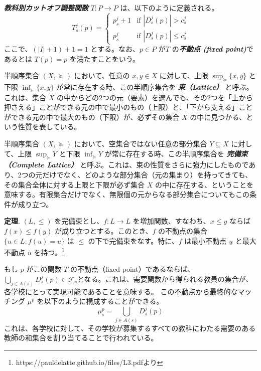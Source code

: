 \documentclass[12pt, a4paper]{article}
\theoremstyle{definition}
\theoremstyle{remark}
\theoremstyle{plain}
\begin{document}
\textbf{\textit{教科別カットオフ調整関数}} $T : P \rightarrow P$ は、以下のように定義される。
\[
T_s^j(p) =
\begin{cases}
p_s^j + 1 & \text{if } | D_s^j(p) | > c^j_s \\
p_s^j     & \text{if } | D_s^j(p) | \leq c^j_s
\end{cases}
\]
ここで、\( (|I| + 1) + 1 = 1 \) とする。なお、$p\in P$ が$T$ の\textbf{\textit{不動点 (fixed point)}}であるとは $T(p)=p$ を満たすことをいう。



半順序集合 $(X, \succeq)$ において、任意の $x, y \in X$ に対して、上限 $\sup_{\succeq} \{x, y\}$ と下限 $\inf_{\succeq} \{x, y\}$ が常に存在する時、この半順序集合を \textbf{\textit{束（Lattice）}} と呼ぶ。これは、集合 $X$ の中からどの2つの元（要素）を選んでも、その2つを「上から押さえる」ことができる元の中で最小のもの（上限）と、「下から支える」ことができる元の中で最大のもの（下限）が、必ずその集合 $X$ の中に見つかる、という性質を表している。


半順序集合 $(X, \succeq)$ において、空集合ではない任意の部分集合 $Y \subseteq X$ に対して、上限 $\sup_{\succeq} Y$ と下限 $\inf_{\succeq} Y$ が常に存在する時、この半順序集合を \textbf{\textit{完備束（Complete Lattice）}} と呼ぶ。これは、束の性質をさらに強力にしたものであり、2つの元だけでなく、どのような部分集合（元の集まり）を持ってきても、その集合全体に対する上限と下限が必ず集合 $X$ の中に存在する、ということを意味する。有限集合だけでなく、無限個の元からなる部分集合についてもこの条件が成り立つ。


\textbf{定理}. $(L, \leq)$ を完備束とし、$f: L \to L$ を増加関数、すなわち、$x \leq y$ ならば $f(x) \leq f(y)$ が成り立つとする。このとき、$f$ の不動点の集合 $\{ u \in L : f(u) = u \}$ は $\leq$ の下で完備束をなす。特に、$f$ は最小不動点 $\underline{u}$ と最大不動点 $\overline{u}$ を持つ。\footnote{https://pauldelatte.github.io/files/L3.pdfより}

\bigbreak

もし $p$ がこの関数 $T$ の不動点（fixed point）であるならば、$\bigcup_{j \in A(s)} D^j_s(p) \in \mathcal{F}_s$となる。これは、需要関数から得られる教員の集合が、各学校にとって実現可能であることを意味する。
この不動点から最終的なマッチング $\mu^p$ を以下のように構成することができる。
\[
\mu^{p}_s =\bigcup_{j \in A(s)} D^j_s(p)
\]
これは、各学校に対して、その学校が募集するすべての教科にわたる需要のある教師の和集合を割り当てることで行われている。
\end{document}
